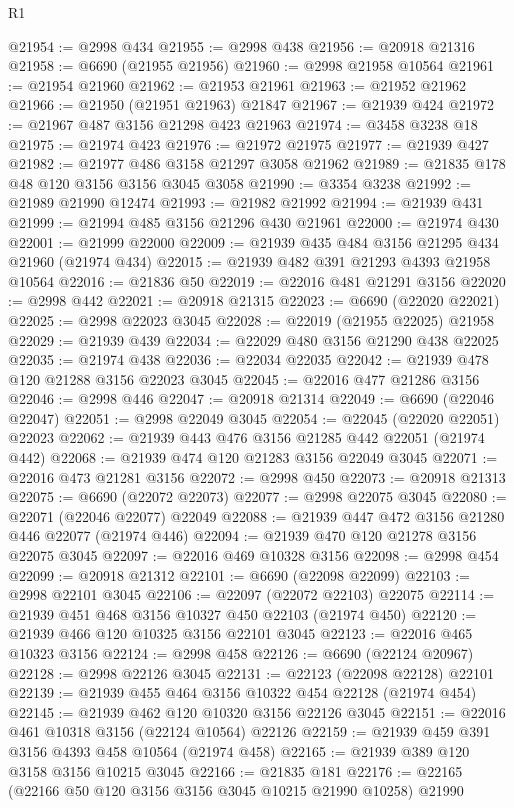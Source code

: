 \begin{lexlean}{R1}
\begin{coremodule}
@21954 := @2998 @434
@21955 := @2998 @438
@21956 := @20918 @21316
@21958 := @6690 (@21955 @21956)
@21960 := @2998 @21958 @10564
@21961 := @21954 @21960
@21962 := @21953 @21961
@21963 := @21952 @21962
@21966 := @21950 (@21951 @21963) @21847
@21967 := @21939 @424
@21972 := @21967 @487 @3156 @21298 @423 @21963
@21974 := @3458 @3238 @18
@21975 := @21974 @423
@21976 := @21972 @21975
@21977 := @21939 @427
@21982 := @21977 @486 @3158 @21297 @3058 @21962
@21989 := @21835 @178 @48 @120 @3156 @3156 @3045 @3058
@21990 := @3354 @3238
@21992 := @21989 @21990 @12474
@21993 := @21982 @21992
@21994 := @21939 @431
@21999 := @21994 @485 @3156 @21296 @430 @21961
@22000 := @21974 @430
@22001 := @21999 @22000
@22009 := @21939 @435 @484 @3156 @21295 @434 @21960 (@21974 @434)
@22015 := @21939 @482 @391 @21293 @4393 @21958 @10564
@22016 := @21836 @50
@22019 := @22016 @481 @21291 @3156
@22020 := @2998 @442
@22021 := @20918 @21315
@22023 := @6690 (@22020 @22021)
@22025 := @2998 @22023 @3045
@22028 := @22019 (@21955 @22025) @21958
@22029 := @21939 @439
@22034 := @22029 @480 @3156 @21290 @438 @22025
@22035 := @21974 @438
@22036 := @22034 @22035
@22042 := @21939 @478 @120 @21288 @3156 @22023 @3045
@22045 := @22016 @477 @21286 @3156
@22046 := @2998 @446
@22047 := @20918 @21314
@22049 := @6690 (@22046 @22047)
@22051 := @2998 @22049 @3045
@22054 := @22045 (@22020 @22051) @22023
@22062 := @21939 @443 @476 @3156 @21285 @442 @22051 (@21974 @442)
@22068 := @21939 @474 @120 @21283 @3156 @22049 @3045
@22071 := @22016 @473 @21281 @3156
@22072 := @2998 @450
@22073 := @20918 @21313
@22075 := @6690 (@22072 @22073)
@22077 := @2998 @22075 @3045
@22080 := @22071 (@22046 @22077) @22049
@22088 := @21939 @447 @472 @3156 @21280 @446 @22077 (@21974 @446)
@22094 := @21939 @470 @120 @21278 @3156 @22075 @3045
@22097 := @22016 @469 @10328 @3156
@22098 := @2998 @454
@22099 := @20918 @21312
@22101 := @6690 (@22098 @22099)
@22103 := @2998 @22101 @3045
@22106 := @22097 (@22072 @22103) @22075
@22114 := @21939 @451 @468 @3156 @10327 @450 @22103 (@21974 @450)
@22120 := @21939 @466 @120 @10325 @3156 @22101 @3045
@22123 := @22016 @465 @10323 @3156
@22124 := @2998 @458
@22126 := @6690 (@22124 @20967)
@22128 := @2998 @22126 @3045
@22131 := @22123 (@22098 @22128) @22101
@22139 := @21939 @455 @464 @3156 @10322 @454 @22128 (@21974 @454)
@22145 := @21939 @462 @120 @10320 @3156 @22126 @3045
@22151 := @22016 @461 @10318 @3156 (@22124 @10564) @22126
@22159 := @21939 @459 @391 @3156 @4393 @458 @10564 (@21974 @458)
@22165 := @21939 @389 @120 @3158 @3156 @10215 @3045
@22166 := @21835 @181
@22176 := @22165 (@22166 @50 @120 @3156 @3156 @3045 @10215 @21990 @10258) @21990

\end{coremodule}
\end{lexlean}
